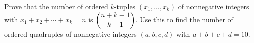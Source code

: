 Prove that the number of ordered $k$-tuples $(x_1,\dots,x_k)$ of nonnegative integers with $x_1+x_2+\cdots+x_k=n$ is $\dbinom{n+k-1}{k-1}$. Use this to find the number of ordered quadruples of nonnegative integers $(a,b,c,d)$ with $a+b+c+d=10$.
